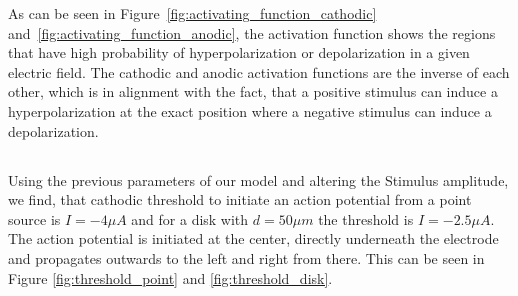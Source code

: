\documentclass{article}
\begin{document}
    As can be seen in Figure~\ref{fig:activating_function_cathodic} and~\ref{fig:activating_function_anodic}, the activation function shows the regions that have high probability of hyperpolarization or depolarization in a given electric field.
    The cathodic and anodic activation functions are the inverse of each other, which is in alignment with the fact, that a positive stimulus can induce a hyperpolarization at the exact position where a negative stimulus can induce a depolarization.

    \subsection{}
    Using the previous parameters of our model and altering the Stimulus amplitude, we find, that cathodic threshold to initiate an action potential from a point source is \(I = -4\mu A\) and for a disk with \(d = 50\mu m\) the threshold is \(I = -2.5\mu A\).
    The action potential is initiated at the center, directly underneath the electrode and propagates outwards to the left and right from there.
    This can be seen in Figure \ref{fig:threshold_point} and \ref{fig:threshold_disk}.
\end{document}
